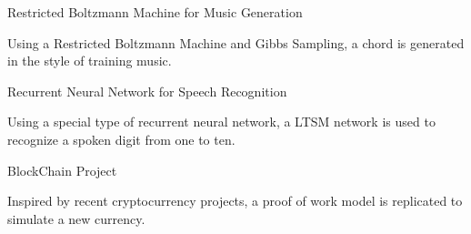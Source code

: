 \begin{cventries}
  \cventryy
    {}
    {Restricted Boltzmann Machine for Music Generation}
    {}
    {}
    {
      \begin{cvitems}
        \item {Using a Restricted Boltzmann Machine and Gibbs Sampling, a chord is generated in the style of training music.}
      \end{cvitems}
    }
  \cventryy
    {}
    {Recurrent Neural Network for Speech Recognition}
    {}
    {}
    {
      \begin{cvitems}
        \item {Using a special type of recurrent neural network, a LTSM network is used to recognize a spoken digit from one to ten.}
      \end{cvitems}
    }
  \cventryy
    {}
    {BlockChain Project}
    {}
    {}
    {
      \begin{cvitems}
        \item {Inspired by recent cryptocurrency projects, a proof of work model is replicated to simulate a new currency.}
      \end{cvitems}
    }

\end{cventries}
